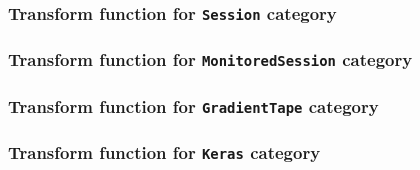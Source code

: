 \subsubsection{Transform function for {\tt Session} category}

\subsubsection{Transform function for {\tt MonitoredSession} category}

\subsubsection{Transform function for {\tt GradientTape} category}

\subsubsection{Transform function for {\tt Keras} category}
